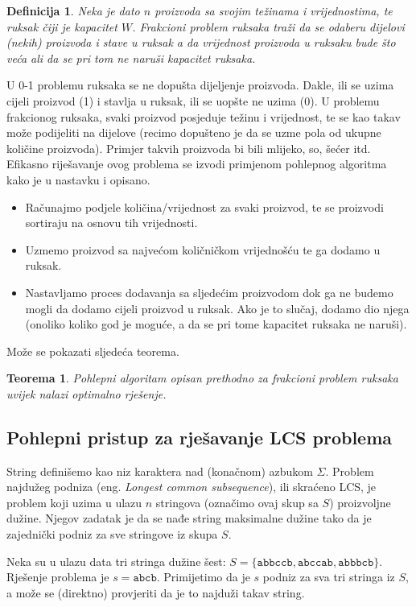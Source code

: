 \documentclass[a4paper, utf8, 11pt, colorlinks]{book}
\newtheorem{definition}{Definicija}
\newtheorem{thm}{Teorema}
\begin{document}
\begin{definition}
  Neka je dato $n$ proizvoda sa svojim  težinama i vrijednostima, 
  te ruksak čiji je kapacitet $W$. Frakcioni problem ruksaka traži da se odaberu dijelovi   (nekih) proizvoda i stave u ruksak a da vrijednost proizvoda u ruksaku bude što veća ali da se pri tom ne naruši kapacitet ruksaka.
\end{definition}
U 0-1 problemu ruksaka se ne dopušta dijeljenje proizvoda. Dakle, ili se uzima cijeli proizvod (1) i stavlja u ruksak, ili se uopšte ne uzima (0). U  problemu frakcionog ruksaka, svaki proizvod posjeduje težinu i vrijednost, te se kao takav može podijeliti na dijelove (recimo dopušteno je da se uzme   pola od ukupne količine proizvoda). Primjer takvih proizvoda bi bili mlijeko, so, šećer itd. Efikasno riješavanje ovog problema se izvodi primjenom pohlepnog algoritma kako je u nastavku i opisano.
\begin{itemize}
	\item Računajmo podjele količina/vrijednost za svaki proizvod, te se proizvodi  sortiraju na osnovu tih vrijednosti.   \item Uzmemo proizvod sa najvećom količničkom vrijednošću te ga dodamo u ruksak. 
	\item Nastavljamo proces dodavanja sa sljedećim proizvodom dok ga ne budemo mogli da dodamo cijeli proizvod u ruksak.    Ako je to slučaj, dodamo dio njega (onoliko koliko god je moguće, a da se pri tome kapacitet ruksaka ne naruši). 
\end{itemize}
Može se pokazati sljedeća teorema. 

\begin{thm}
      Pohlepni algoritam opisan prethodno za frakcioni problem ruksaka uvijek nalazi optimalno rješenje.
\end{thm}
\subsection{Pohlepni pristup za rješavanje LCS problema}

String definišemo kao niz karaktera nad (konačnom) azbukom $\Sigma$. 
Problem najdužeg podniza (eng. \emph{Longest common subsequence}), ili skraćeno LCS, je problem koji uzima u ulazu  $n$ stringova (označimo ovaj skup sa $S$) proizvoljne dužine. Njegov zadatak je da se nađe string maksimalne dužine tako da je  zajednički podniz za sve stringove iz skupa $S$. 

 Neka su u ulazu data tri stringa dužine šest: $S = \{  \texttt{abbccb}, \texttt{abccab}, \texttt{abbbcb}   \}$. Rješenje problema je $s=\texttt{abcb}$. Primijetimo da je $s$ podniz za sva tri stringa iz $S$, a može se (direktno) provjeriti da je to najduži takav string. 
 
\end{document}
